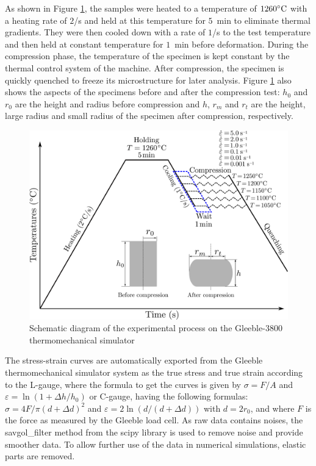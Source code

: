 \documentclass[metals,article,submit,pdftex,moreauthors]{Definitions/mdpi}
\begin{document}
As shown in Figure \ref{fig:GleebleProcess}, the samples were heated to a temperature of $1260\celsius$ with a heating rate of $2$\celsius/s and held at this temperature for $5$~min to eliminate thermal gradients.
They were then cooled down with a rate of $1$\celsius/s to the test temperature and then held at constant temperature for $1$~min before deformation.
During the compression phase, the temperature of the specimen is kept constant by the thermal control system of the machine.
After compression, the specimen is quickly quenched to freeze its microstructure for later analysis.
Figure \ref{fig:GleebleProcess} also shows the aspects of the specimens before and after the compression test: $h_0$ and $r_0$ are the height and radius before compression and $h$, $r_m$ and $r_t$ are the height, large radius and small radius of the specimen after compression, respectively.
\begin{figure}[!ht]
\centering
\includegraphics[width=0.8\columnwidth]{Figures/GleebleProcess}
\caption{Schematic diagram of the experimental process on the Gleeble-3800 thermomechanical simulator}
\label{fig:GleebleProcess}
\end{figure}

The stress-strain curves are automatically exported from the Gleeble thermomechanical simulator system as the true stress and true strain according to the L-gauge, where the formula to get the curves is given by $\sigma=F/A$ and $\varepsilon=\ln\left(1+\Delta h / h_0\right)$ or C-gauge, having the following formulas: $\sigma = 4F/\pi(d+\Delta d)^2$ and $\varepsilon = 2\ln\left(d/(d+\Delta d)\right)$ with $d = 2r_0$, and where $F$ is the force as measured by the Gleeble load cell.
As raw data contains noises, the savgol\_filter method from the scipy library is used to remove noise and provide smoother data.
To allow further use of the data in numerical simulations, elastic parts are removed.
\end{document}
